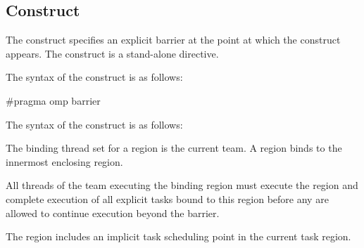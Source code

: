 \subsection{ Construct}
\label{subsec:barrier Construct}
\summary
The  construct specifies an explicit barrier at the point at which the construct
appears. The  construct is a stand-alone directive.

\syntax
\begin{ccppspecific}
The syntax of the  construct is as follows:

\begin{ompcPragma}
#pragma omp barrier 
\end{ompcPragma}
\end{ccppspecific}

\begin{fortranspecific}
The syntax of the  construct is as follows:

\end{fortranspecific}

\binding
The binding thread set for a  region is the current team. A  region
binds to the innermost enclosing  region.

\descr
All threads of the team executing the binding  region must execute the
 region and complete execution of all explicit tasks bound to this 
region before any are allowed to continue execution beyond the barrier.

The  region includes an implicit task scheduling point in the current task
region.

\def\omptSyncRegionEvents#1{
The \plc{#1-begin} event occurs in each thread encountering the
\code{#1} construct on entry to the \code{#1} region.

The \plc{#1-wait-begin} event occurs when a task begins an interval of active or passive waiting
in a \code{#1} region.

The \plc{#1-wait-end} event occurs when a task ends an interval of active or passive waiting
and resumes execution in a \code{#1} region.

The \plc{#1-end} event occurs in each thread encountering the
\code{#1} construct after the #1 synchronization on exit from the
\code{#1} region.
}

